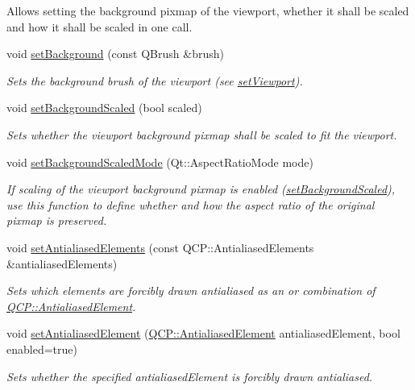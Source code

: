 \begin{DoxyCompactItemize}
\begin{DoxyCompactList}
Allows setting the background pixmap of the viewport, whether it shall be scaled and how it shall be scaled in one call. \end{DoxyCompactList}\item 
void \hyperlink{classQCustomPlot_a8ed256cf467bfa7ba1f9feaae62c3bd0}{set\+Background} (const Q\+Brush \&brush)
\begin{DoxyCompactList}\small\item\em Sets the background brush of the viewport (see \hyperlink{classQCustomPlot_a3f9bc4b939dd8aaba9339fd09f273fc4}{set\+Viewport}). \end{DoxyCompactList}\item 
void \hyperlink{classQCustomPlot_a36f0fa1317325dc7b7efea615ee2de1f}{set\+Background\+Scaled} (bool scaled)
\begin{DoxyCompactList}\small\item\em Sets whether the viewport background pixmap shall be scaled to fit the viewport. \end{DoxyCompactList}\item 
void \hyperlink{classQCustomPlot_a4c0eb4865b7949f62e1cb97db04a3de0}{set\+Background\+Scaled\+Mode} (Qt\+::\+Aspect\+Ratio\+Mode mode)
\begin{DoxyCompactList}\small\item\em If scaling of the viewport background pixmap is enabled (\hyperlink{classQCustomPlot_a36f0fa1317325dc7b7efea615ee2de1f}{set\+Background\+Scaled}), use this function to define whether and how the aspect ratio of the original pixmap is preserved. \end{DoxyCompactList}\item 
void \hyperlink{classQCustomPlot_af6f91e5eab1be85f67c556e98c3745e8}{set\+Antialiased\+Elements} (const Q\+C\+P\+::\+Antialiased\+Elements \&antialiased\+Elements)
\begin{DoxyCompactList}\small\item\em Sets which elements are forcibly drawn antialiased as an {\itshape or} combination of \hyperlink{namespaceQCP_ae55dbe315d41fe80f29ba88100843a0c}{Q\+C\+P\+::\+Antialiased\+Element}. \end{DoxyCompactList}\item 
void \hyperlink{classQCustomPlot_aeef813bcf7efab8e765f9f87ec454691}{set\+Antialiased\+Element} (\hyperlink{namespaceQCP_ae55dbe315d41fe80f29ba88100843a0c}{Q\+C\+P\+::\+Antialiased\+Element} antialiased\+Element, bool enabled=true)
\begin{DoxyCompactList}\small\item\em Sets whether the specified {\itshape antialiased\+Element} is forcibly drawn antialiased. \end{DoxyCompactList}\item 

\end{DoxyCompactItemize}

